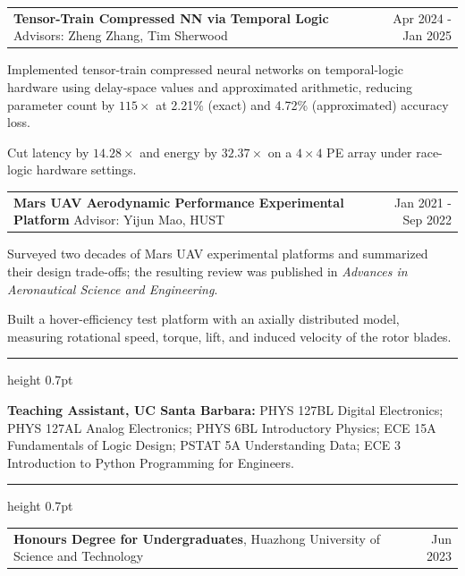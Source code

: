 \documentclass[10pt,letterpaper]{article}
\makeatletter
\newcommand{\cvsection}[1]{%
  \vspace{0.95em}%
  \noindent{\large\bfseries\color{accent}\textls[110]{\textsc{#1}}}\par
  \vspace{0.12em}%
  {\color{accent}\hrule height 0.7pt}%
  \vspace{0.55em}%
}
\newcommand{\entry}[2]{%
  \noindent\begin{tabularx}{\textwidth}{@{}X@{\hspace{1.4em}}r@{}}
    #1 & {\color{muted}#2}
  \end{tabularx}\par
}
\makeatother
\begin{document}
\vspace{0.6em}
\entry{\textbf{Tensor-Train Compressed NN via Temporal Logic} \textbar{} Advisors: Zheng Zhang, Tim Sherwood}{Apr 2024 - Jan 2025}
\begin{cvitems}
  \item Implemented tensor-train compressed neural networks on temporal-logic hardware using delay-space values and approximated arithmetic, reducing parameter count by $115\times$ at 2.21\% (exact) and 4.72\% (approximated) accuracy loss.
  \item Cut latency by $14.28\times$ and energy by $32.37\times$ on a $4\times4$ PE array under race-logic hardware settings.
\end{cvitems}

\vspace{0.6em}
\entry{\textbf{Mars UAV Aerodynamic Performance Experimental Platform} \textbar{} Advisor: Yijun Mao, HUST}{Jan 2021 - Sep 2022}
\begin{cvitems}
  \item Surveyed two decades of Mars UAV experimental platforms and summarized their design trade-offs; the resulting review was published in \textit{Advances in Aeronautical Science and Engineering}.
  \item Built a hover-efficiency test platform with an axially distributed model, measuring rotational speed, torque, lift, and induced velocity of the rotor blades.
\end{cvitems}

\cvsection{Teaching}

\noindent\textbf{Teaching Assistant, UC Santa Barbara:} PHYS 127BL Digital Electronics; PHYS 127AL Analog Electronics; PHYS 6BL Introductory Physics; ECE 15A Fundamentals of Logic Design; PSTAT 5A Understanding Data; ECE 3 Introduction to Python Programming for Engineers.

\cvsection{Honors}

\entry{\textbf{Honours Degree for Undergraduates}, Huazhong University of Science and Technology}{Jun 2023}
\end{document}
